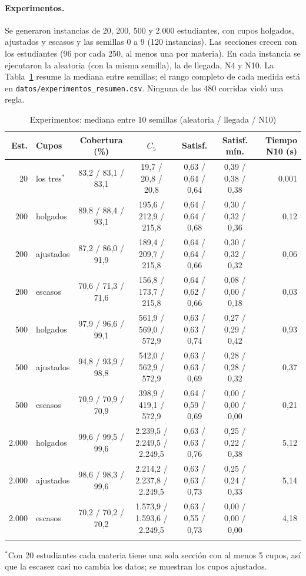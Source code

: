 \paragraph{Experimentos.} Se generaron instancias de 20, 200, 500 y 2.000 estudiantes, con cupos holgados, ajustados y escasos y las semillas 0 a 9 (120 instancias). Las secciones crecen con los estudiantes (96 por cada 250, al menos una por materia). En cada instancia se ejecutaron la aleatoria (con la misma semilla), la de llegada, N4 y N10. La Tabla~\ref{tab:experimentos} resume la mediana entre semillas; el rango completo de cada medida está en \texttt{datos/experimentos\_resumen.csv}. Ninguna de las 480 corridas violó una regla.

\begin{table}[htbp]
\caption{Experimentos: mediana entre 10 semillas (aleatoria / llegada / N10)}\label{tab:experimentos}
\footnotesize
\begin{tabular*}{\textwidth}{@{\extracolsep\fill}rlccccr@{}}
\toprule
Est. & Cupos & Cobertura (\%) & $C_5$ & Satisf. & Satisf. mín. & Tiempo N10 (s) \\
\midrule
20 & los tres$^{*}$ & 83,2 / 83,1 / 83,1 & 19,7 / 20,8 / 20,8 & 0,63 / 0,64 / 0,64 & 0,39 / 0,38 / 0,38 & 0,001 \\
200 & holgados & 89,8 / 88,4 / 93,1 & 195,6 / 212,9 / 215,8 & 0,64 / 0,64 / 0,68 & 0,30 / 0,32 / 0,36 & 0,12 \\
200 & ajustados & 87,2 / 86,0 / 91,9 & 189,4 / 209,7 / 215,8 & 0,64 / 0,64 / 0,66 & 0,30 / 0,32 / 0,32 & 0,06 \\
200 & escasos & 70,6 / 71,3 / 71,6 & 156,8 / 173,7 / 215,8 & 0,64 / 0,62 / 0,66 & 0,08 / 0,00 / 0,18 & 0,03 \\
500 & holgados & 97,9 / 96,6 / 99,1 & 561,9 / 569,0 / 572,9 & 0,63 / 0,63 / 0,74 & 0,27 / 0,29 / 0,42 & 0,93 \\
500 & ajustados & 94,8 / 93,9 / 98,8 & 542,0 / 562,9 / 572,9 & 0,63 / 0,63 / 0,69 & 0,28 / 0,28 / 0,32 & 0,37 \\
500 & escasos & 70,9 / 70,9 / 70,9 & 398,9 / 419,1 / 572,9 & 0,64 / 0,59 / 0,69 & 0,00 / 0,00 / 0,00 & 0,21 \\
2.000 & holgados & 99,6 / 99,5 / 99,6 & 2.239,5 / 2.249,5 / 2.249,5 & 0,63 / 0,63 / 0,76 & 0,25 / 0,22 / 0,38 & 5,12 \\
2.000 & ajustados & 98,6 / 98,3 / 99,6 & 2.214,2 / 2.237,8 / 2.249,5 & 0,63 / 0,63 / 0,73 & 0,25 / 0,24 / 0,33 & 5,14 \\
2.000 & escasos & 70,2 / 70,2 / 70,2 & 1.573,9 / 1.593,6 / 2.249,5 & 0,63 / 0,55 / 0,73 & 0,00 / 0,00 / 0,00 & 4,18 \\
\botrule
\end{tabular*}
\footnotesize{$^{*}$Con 20 estudiantes cada materia tiene una sola sección con al menos 5 cupos, así que la escasez casi no cambia los datos; se muestran los cupos ajustados.}
\end{table}

